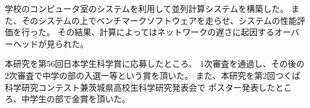 \def \wrkdir {p.ngk/}

 \label{pa:ngk}
学校のコンピュータ室のシステムを利用して並列計算システムを構築した。
また、そのシステムの上でベンチマークソフトウェアを走らせ、システムの性能評価を行った。
その結果、計算によってはネットワークの遅さに起因するオーバーヘッドが見られた。

本研究を第56回日本学生科学賞に応募したところ、
1次審査を通過し、その後の2次審査で中学の部の入選一等という賞を頂いた。
また、本研究を第2回つくば科学研究コンテスト兼茨城県高校生科学研究発表会で
ポスター発表したところ、中学生の部で金賞を頂いた。
